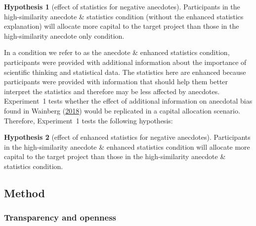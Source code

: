 \documentclass[
  man, donotrepeattitle,floatsintext]{apa7}
\theoremstyle{definition}
\theoremstyle{definition}
\theoremstyle{definition}
\theoremstyle{definition}
\newtheorem{hypothesis}{Hypothesis}
\theoremstyle{remark}
\begin{document}
\begin{hypothesis}[effect of statistics for negative anecdotes]
\protect\hypertarget{hyp:statistics-anecdotes-1}{}\label{hyp:statistics-anecdotes-1}Participants in the high-similarity anecdote \& statistics condition (without the
enhanced statistics explanation) will allocate more capital to the target
project than those in the high-similarity anecdote only condition.
\end{hypothesis}

In a condition we refer to as the anecdote \& enhanced statistics condition,
participants were provided with additional information about the importance of
scientific thinking and statistical data. The statistics here are enhanced
because participants were provided with information that should help them better
interpret the statistics and therefore may be less affected by anecdotes.
Experiment~1 tests whether the effect of additional information on anecdotal
bias found in Wainberg (\protect\hyperlink{ref-wainberg2018}{2018}) would be replicated in a capital allocation
scenario. Therefore, Experiment~1 tests the following hypothesis:

\begin{hypothesis}[effect of enhanced statistics for negative anecdotes]
\protect\hypertarget{hyp:enhanced-statistics-anecdotes-1}{}\label{hyp:enhanced-statistics-anecdotes-1}Participants in the high-similarity anecdote \& enhanced statistics condition
will allocate more capital to the target project than those in the
high-similarity anecdote \& statistics condition.
\end{hypothesis}

\hypertarget{method-1}{%
\subsection{Method}\label{method-1}}

\hypertarget{transparency-and-openness}{%
\subsubsection{Transparency and openness}\label{transparency-and-openness}}
\end{document}
